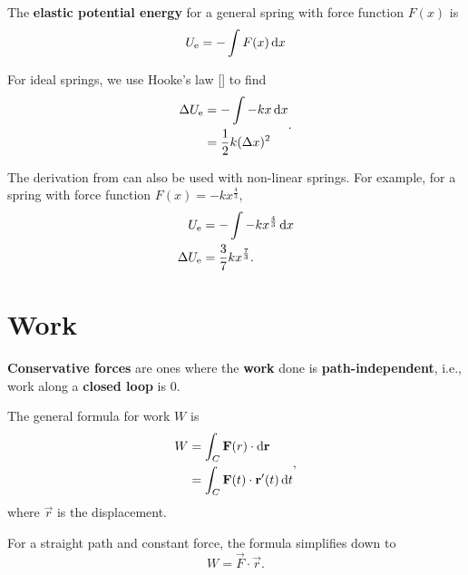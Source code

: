 The \textbf{elastic potential energy} for a general spring with force
function \(F(x)\) is
\begin{equation} \label{eq:general-elastic-potential-energy}
    U_\mathrm{e} = - \int F(x) \odif{x}
\end{equation}

For ideal springs, we use Hooke's law [] to find
\begin{equation}
    \begin{aligned}
        \Delta{U_\mathrm{e}} &= - \int - k x \odif{x} \\
        &= \frac{1}{2} k (\Delta{x})^2
    \end{aligned}.
\end{equation}

The derivation from  can
also be used with non-linear springs.
For example, for a spring with force function \(F(x) = -k x^\frac{4}{3}\),
\begin{equation}
    \begin{aligned}
        U_\mathrm{e} &= - \int - k x^\frac{4}{3} \odif{x} \\
        \Delta{U_\mathrm{e}} &= \frac{3}{7} k x^\frac{7}{3}.
    \end{aligned}
\end{equation}

\section{Work}

\textbf{Conservative forces} are ones where the \textbf{work} done is
\textbf{path-independent},
i.e., work along a \textbf{closed loop} is 0.

The general formula for work \(W\) is
\begin{equation} \label{eq:work}
    \begin{aligned}
        W &= \int_C \vec{F}(r) \cdot \odif{\vec{r}} \\
        &= \int_C \vec{F}(t) \cdot \vec{r}'(t) \odif{t} \\
    \end{aligned},
\end{equation}
where \(\vec{r}\) is the displacement.

For a straight path and constant force,
the formula simplifies down to
\begin{equation*}
    W = \vec{F} \cdot \vec{r}.
\end{equation*}

